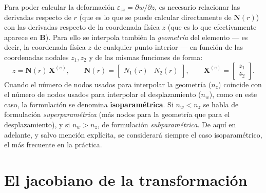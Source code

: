 Para poder calcular la deformación $\varepsilon_{zz}=\partial w/\partial z$, es necesario relacionar las derivadas respecto de $r$ (que es lo que se puede calcular directamente de $\bm N(r)$) con las derivadas respecto de la coordenada física $z$ (que es lo que efectivamente aparece en $\bm B$). Para ello se interpola también la \emph{geometría} del elemento --- es decir, la coordenada física $z$ de cualquier punto interior --- en función de las coordenadas nodales $z_1,z_2$ y de las mismas funciones de forma:
\[
z = \bm N(r)\,\bm X^{(e)}, \qquad \bm N(r)=\begin{bmatrix}N_1(r) & N_2(r)\end{bmatrix}, \qquad \bm X^{(e)} = \begin{bmatrix} z_1 \\ z_2 \end{bmatrix} .
\]
Cuando el número de nodos usados para interpolar la geometría ($n_z$) coincide con el número de nodos usados para interpolar el desplazamiento ($n_w$), como en este caso, la formulación se denomina \textbf{isoparamétrica}. Si $n_w<n_z$ se habla de formulación \emph{superparamétrica} (más nodos para la geometría que para el desplazamiento), y si $n_w>n_z$, de formulación \emph{subparamétrica}. De aquí en adelante, y salvo mención explícita, se considerará siempre el caso isoparamétrico, el más frecuente en la práctica.

\section{El jacobiano de la transformación}

